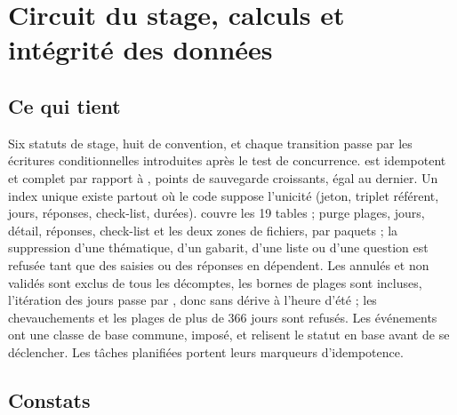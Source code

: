 \documentclass[11pt,a4paper]{article}
\begin{document}
\section{Circuit du stage, calculs et intégrité des données}

\subsection{Ce qui tient}

Six statuts de stage, huit de convention, et chaque transition passe par les écritures
conditionnelles introduites après le test de concurrence.  est idempotent et
complet par rapport à , points de sauvegarde croissants, 
égal au dernier. Un index unique existe partout où le code suppose l'unicité (jeton, triplet
référent, jours, réponses, check-list, durées).  couvre les 19
tables ;  purge plages, jours, détail, réponses, check-list et les
deux zones de fichiers, par paquets ; la suppression d'une thématique, d'un gabarit, d'une liste
ou d'une question est refusée tant que des saisies ou des réponses en dépendent. Les annulés et
non validés sont exclus de tous les décomptes, les bornes de plages sont incluses, l'itération
des jours passe par , donc sans dérive à l'heure d'été ; les
chevauchements et les plages de plus de 366 jours sont refusés. Les événements ont une classe de
base commune,  imposé, et relisent le statut en base avant de se déclencher.
Les tâches planifiées portent leurs marqueurs d'idempotence.

\subsection{Constats}
\end{document}
